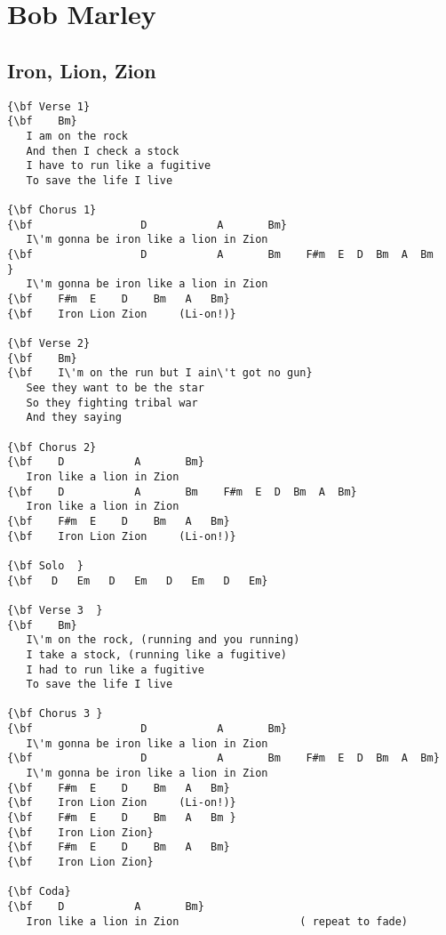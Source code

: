 \documentclass[a4paper]{article}
\begin{document}
\section{Bob Marley} %
\label{sec:Bob Marley}
\subsection{Iron, Lion, Zion} %
\label{sub:Road to Zio}
\begin{Verbatim}[commandchars=\\\{\}]
{\bf Verse 1}
{\bf    Bm}
   I am on the rock
   And then I check a stock
   I have to run like a fugitive
   To save the life I live

{\bf Chorus 1}
{\bf                 D           A       Bm}
   I\'m gonna be iron like a lion in Zion
{\bf                 D           A       Bm    F#m  E  D  Bm  A  Bm   }
   I\'m gonna be iron like a lion in Zion
{\bf    F#m  E    D    Bm   A   Bm}
{\bf    Iron Lion Zion     (Li-on!)}

{\bf Verse 2}
{\bf    Bm}
{\bf    I\'m on the run but I ain\'t got no gun}
   See they want to be the star
   So they fighting tribal war
   And they saying

{\bf Chorus 2}
{\bf    D           A       Bm}
   Iron like a lion in Zion
{\bf    D           A       Bm    F#m  E  D  Bm  A  Bm}
   Iron like a lion in Zion
{\bf    F#m  E    D    Bm   A   Bm}
{\bf    Iron Lion Zion     (Li-on!)}

{\bf Solo  }
{\bf   D   Em   D   Em   D   Em   D   Em}

{\bf Verse 3  }
{\bf    Bm}
   I\'m on the rock, (running and you running)
   I take a stock, (running like a fugitive)
   I had to run like a fugitive
   To save the life I live

{\bf Chorus 3 }
{\bf                 D           A       Bm}
   I\'m gonna be iron like a lion in Zion
{\bf                 D           A       Bm    F#m  E  D  Bm  A  Bm}
   I\'m gonna be iron like a lion in Zion
{\bf    F#m  E    D    Bm   A   Bm}
{\bf    Iron Lion Zion     (Li-on!)}
{\bf    F#m  E    D    Bm   A   Bm }
{\bf    Iron Lion Zion}
{\bf    F#m  E    D    Bm   A   Bm}
{\bf    Iron Lion Zion}

{\bf Coda}
{\bf    D           A       Bm}
   Iron like a lion in Zion                   ( repeat to fade)
\end{Verbatim}
\newpage
\end{document}
